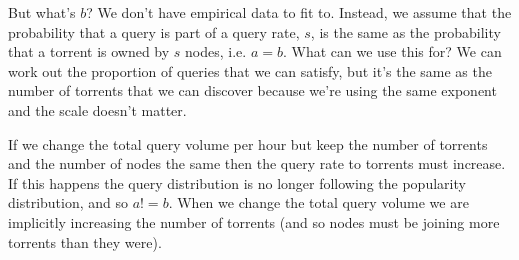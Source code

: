 \documentclass{article}
\begin{document}
        But what's $b$? We don't have empirical data to fit to. Instead, we assume that the probability that a query is part of a query rate, $s$, is the same as the probability that a torrent is owned by $s$ nodes, i.e. $a=b$. What can we use this for? We can work out the proportion of queries that we can satisfy, but it's the same as the number of torrents that we can discover because we're using the same exponent and the scale doesn't matter.

        If we change the total query volume per hour but keep the number of torrents and the number of nodes the same then the query rate to torrents must increase. If this happens the query distribution is no longer following the popularity distribution, and so $a!=b$. When we change the total query volume we are implicitly increasing the number of torrents (and so nodes must be joining more torrents than they were).
\end{document}
